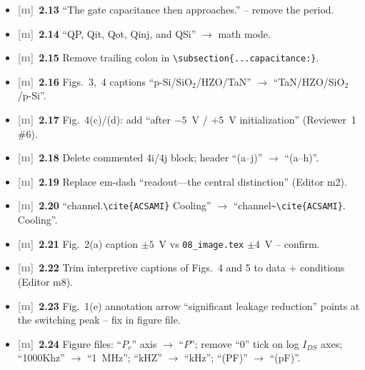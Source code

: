 \documentclass[10pt,a4paper]{article}
\newcommand{\m}{\textcolor{gray}{\textbf{[m]}}}
\begin{document}
\begin{itemize}
\item \m\ \textbf{2.13} ``The gate capacitance then approaches.'' -- remove the period.
\item \m\ \textbf{2.14} ``QP, Qit, Qot, Qinj, and QSi'' $\rightarrow$ math mode.
\item \m\ \textbf{2.15} Remove trailing colon in \verb|\subsection{...capacitance:}|.
\item \m\ \textbf{2.16} Figs.~3,~4 captions ``p-Si/SiO$_2$/HZO/TaN'' $\rightarrow$ ``TaN/HZO/SiO$_2$/p-Si''.
\item \m\ \textbf{2.17} Fig.~4(c)/(d): add ``after $-5$~V / $+5$~V initialization'' (Reviewer~1 \#6).
\item \m\ \textbf{2.18} Delete commented 4i/4j block; header ``(a--j)'' $\rightarrow$ ``(a--h)''.
\item \m\ \textbf{2.19} Replace em-dash ``readout---the central distinction'' (Editor m2).
\item \m\ \textbf{2.20} ``channel.\verb|\cite{ACSAMI}| Cooling'' $\rightarrow$ ``channel\verb|~\cite{ACSAMI}|. Cooling''.
\item \m\ \textbf{2.21} Fig.~2(a) caption $\pm5$~V vs \texttt{08\_image.tex} $\pm4$~V -- confirm.
\item \m\ \textbf{2.22} Trim interpretive captions of Figs.~4 and 5 to data + conditions (Editor m8).
\item \m\ \textbf{2.23} Fig.~1(e) annotation arrow ``significant leakage reduction'' points at the switching peak -- fix in figure file.
\item \m\ \textbf{2.24} Figure files: ``$P_r$'' axis $\rightarrow$ ``$P$''; remove ``0'' tick on log $I_{DS}$ axes; ``1000Khz'' $\rightarrow$ ``1~MHz''; ``kHZ'' $\rightarrow$ ``kHz''; ``(PF)'' $\rightarrow$ ``(pF)''.
\end{itemize}

\end{document}
